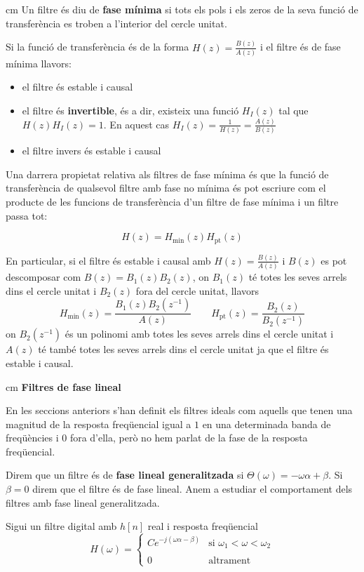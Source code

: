 \documentclass{article}
\begin{document}
 cm
Un filtre és diu de \textbf{fase mínima} si tots els pols i els zeros de la seva funció de transferència
es troben a l'interior del cercle unitat. 

Si la funció de transferència és de la forma $H(z)=\frac{B(z)}{A(z)}$ i el filtre és
de fase mínima llavors:
\begin{itemize}
\item el filtre és estable i causal
\item el filtre és \textbf{invertible}, és a dir, existeix una funció $H_I(z)$ tal que $H(z) H_I(z)=1$.
En aquest cas $H_I(z)=\frac{1}{H(z)}=\frac{A(z)}{B(z)}$
\item el filtre invers és estable i causal
\end{itemize}

Una darrera propietat relativa als filtres de fase mínima és que la funció de transferència de
qualsevol filtre amb fase no mínima és pot escriure com el producte de les funcions de
transferència d'un filtre de fase mínima i un filtre passa tot:

\[
H(z)=H_{\text{min}}(z) H_{\text{pt}}(z)
\]

En particular, si el filtre és estable i causal amb $H(z)=\frac{B(z)}{A(z)}$ i 
$B(z)$ es pot descomposar com $B(z)=B_1(z) B_2(z)$,
on $B_1(z)$ té totes les seves arrels dins el cercle unitat i $B_2(z)$ fora del cercle unitat,
llavors 
\[
H_{\text{min}}(z)=\frac{ B_1(z) B_2(z^{-1}) }{A(z)}
\qquad 
H_{\text{pt}}(z)=\frac{B_2(z)}{B_2(z^{-1})}
\]
\noindent
on $B_2(z^{-1})$ és un polinomi amb totes les seves arrels dins el cercle unitat i $A(z)$ té també 
totes les seves arrels dins el cercle unitat ja que el filtre és estable i causal. 


 cm
\textbf{Filtres de fase lineal}

En les seccions anteriors s'han definit els filtres ideals com aquells que tenen una magnitud 
de la resposta freqüencial igual a $1$ en una determinada banda de freqüències i $0$ fora
d'ella, però no hem parlat de la fase de la resposta freqüencial.

Direm que un filtre és de \textbf{fase lineal generalitzada} si $\Theta(\omega)=-\omega \alpha + \beta$.
Si $\beta=0$ direm que el filtre és de fase lineal. Anem a estudiar el comportament
dels filtres amb fase lineal generalitzada.

Sigui un filtre digital amb $h[n]$ real i resposta freqüencial
\[
H(\omega)=\begin{cases} C e^{-j( \omega \alpha - \beta)} & \text{si } \omega_1 < \omega < \omega_2 \\ \\
0 & \text{altrament} \end{cases}
\]
\end{document}
